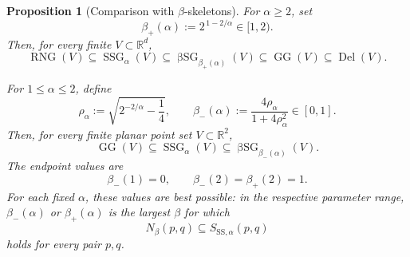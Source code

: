 \documentclass[a4paper,fleqn]{cas-sc}
\newtheorem{proposition}{Proposition}
\theoremstyle{definition}
\theoremstyle{remark}
\newcommand{\R}{\mathds{R}}
\newcommand{\0}{\mathbf{0}}
\DeclareMathOperator{\SSG}{SSG}
\DeclareMathOperator{\BSG}{\beta SG}
\DeclareMathOperator{\RNG}{RNG}
\DeclareMathOperator{\GG}{GG}
\DeclareMathOperator{\Del}{Del}
\begin{document}
\begin{proposition}[Comparison with $\beta$-skeletons]
\label{prop:beta-comparison}
For $\alpha\geq2$, set
\begin{equation}\label{eq:beta-plus}
    \beta_+(\alpha):=2^{\,1-2/\alpha}\in[1,2).
\end{equation}
Then, for every finite $V\subset\R^d$,
\begin{equation}\label{eq:beta-upper-chain}
    \RNG(V)
    \subseteq \SSG_\alpha(V)
    \subseteq \BSG_{\beta_+(\alpha)}(V)
    \subseteq \GG(V)
    \subseteq \Del(V).
\end{equation}

For $1\leq\alpha\leq2$, define
\begin{equation}\label{eq:beta-minus}
    \rho_\alpha
    :=\sqrt{2^{-2/\alpha}-\frac14},
    \qquad
    \beta_-(\alpha)
    :=\frac{4\rho_\alpha}{1+4\rho_\alpha^2}\in[0,1].
\end{equation}
Then, for every finite planar point set $V\subset\R^2$,
\begin{equation}\label{eq:beta-lower-chain}
    \GG(V)
    \subseteq \SSG_\alpha(V)
    \subseteq \BSG_{\beta_-(\alpha)}(V).
\end{equation}
The endpoint values are
\begin{equation}
    \beta_-(1)=0,
    \qquad
    \beta_-(2)=\beta_+(2)=1.
\end{equation}
For each fixed $\alpha$, these values are best possible: in the respective
parameter range, $\beta_-(\alpha)$ or $\beta_+(\alpha)$ is the largest
$\beta$ for which
\begin{equation}\label{eq:beta-region-comparison}
    N_\beta(p,q)\subseteq S_{\mathrm{SS},\alpha}(p,q)
\end{equation}
holds for every pair $p,q$.
\end{proposition}
\end{document}
